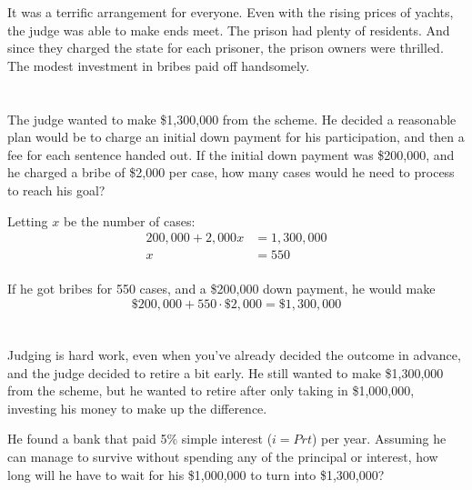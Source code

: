 \documentclass[letterpaper, landscape]{exam}
\begin{document}
\begin{questions}
      It was a terrific arrangement for everyone.  Even with the rising prices of yachts, the judge
      was able to make ends meet.  The prison had plenty of residents.  And since they charged the
      state for each prisoner, the prison owners were thrilled. The modest investment in bribes paid
      off handsomely.

      \begin{parts}
        \part{}
          The judge wanted to make \$1,300,000 from the scheme.  He decided a reasonable plan would
          be to charge an initial down payment for his participation, and then a fee for each
          sentence handed out.  If the initial down payment was \$200,000, and he charged a bribe of
          \$2,000 per case, how many cases would he need to process to reach his goal?

          \begin{solution}
            Letting $x$ be the number of cases:
            \begin{align*}
              200,000 + 2,000x & = 1,300,000 \\
              x                & = \boxed{ 550 } \\
            \end{align*}

            If he got bribes for 550 cases, and a \$200,000 down payment, he would make 
            \[
              \$200,000 + 550 \cdot \$2,000 = \$1,300,000
            \]
          \end{solution}

        \part{}
          Judging is hard work, even when you've already decided the outcome in advance, and the
          judge decided to retire a bit early.  He still wanted to make \$1,300,000 from the scheme,
          but he wanted to retire after only taking in \$1,000,000, investing his money to make up
          the difference.  

          He found a bank that paid 5\% simple interest ($i = Prt$) per year. Assuming he can manage
          to survive without spending any of the principal or interest, how long will he have to
          wait for his \$1,000,000 to turn into \$1,300,000?


\end{parts}
\end{questions}
\end{document}
